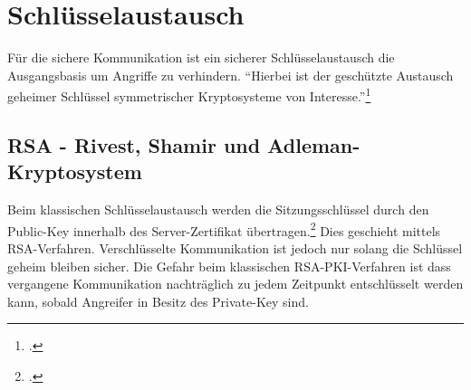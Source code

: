 \documentclass  [paper=a4,
				fontsize=12pt,
				listof=totoc,
				bibliography=totoc
				]{scrreprt}
\begin{document}
		\section{Schlüsselaustausch}
			Für die sichere Kommunikation ist ein sicherer Schlüsselaustausch die Ausgangsbasis um Angriffe zu verhindern. ``Hierbei ist der geschützte Austausch geheimer Schlüssel symmetrischer Kryptosysteme von Interesse.''\footcite[S. 437]{Eckert2013}
			\subsection{RSA - Rivest, Shamir und Adleman-Kryptosystem} 
				Beim klassischen Schlüsselaustausch werden die Sitzungsschlüssel durch den Public-Key innerhalb des Server-Zertifikat übertragen.\footcite[Vgl.][]{Boeck2013} Dies geschieht mittels \ac{RSA}-Verfahren. Verschlüsselte Kommunikation ist jedoch nur solang die Schlüssel geheim bleiben sicher. Die Gefahr beim klassischen \ac{RSA}-\ac{PKI}-Verfahren ist dass vergangene Kommunikation nachträglich zu jedem Zeitpunkt entschlüsselt werden kann, sobald Angreifer in Besitz des Private-Key sind.\medskip\\
\end{document}
